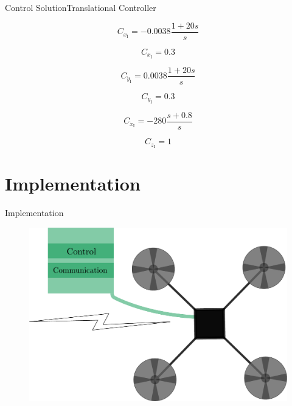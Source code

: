 \begin{frame}{Control Solution}{Translational Controller}
  \centering
  \begin{minipage}{0.4\linewidth}
    \[ C_{\dot{x}_{\mathrm{I}}} = -0.0038\frac{1+20 s}{s} \]
  \end{minipage}%
  \begin{minipage}{0.4\linewidth}
    \[ C_{x_{\mathrm{I}}} = 0.3 \]
  \end{minipage}
  \begin{minipage}{0.4\linewidth}
    \[ C_{\dot{y}_{\mathrm{I}}} = 0.0038\frac{1+20 s}{s} \]
  \end{minipage}%
  \begin{minipage}{0.4\linewidth}
    \[ C_{y_{\mathrm{I}}} = 0.3 \]
  \end{minipage}
  \begin{minipage}{0.4\linewidth}
    \[ C_{\dot{x}_{\mathrm{I}}} = -280 \frac{s+0.8}{s} \]
  \end{minipage}%
  \begin{minipage}{0.4\linewidth}
    \[ C_{z_{\mathrm{I}}} = 1 \]
  \end{minipage}
\end{frame}

\section{Implementation}
\begin{frame}{Implementation}{}
  \begin{figure}[H]
    \hspace*{-.8cm}
    \includegraphics[width=.8\linewidth]{figures/tasks}
  \end{figure}  
\end{frame}

